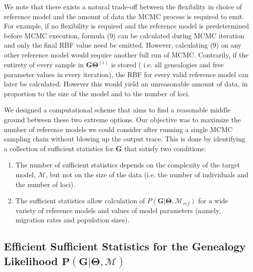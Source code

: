 \documentclass[11pt]{article}
\newcommand{\vect}[1]{\boldsymbol{\mathbf{#1}}}
\newcommand{\M}{\mathcal{M}}
\newcommand{\G}{\vect{G}}
\newcommand{\T}{\vect{\Theta}}
\newcommand{\GT}{\G\T}
\newcommand{\Mref}{\M_{ref}}
\newcommand{\1}{\mathbbm{1}}
\begin{document}
We note that there exists a natural trade-off between the flexibility in choice of reference model and the amount of data the MCMC process is required to emit. For example, if no flexibility is required and the reference model is predetermined before MCMC execution, formula (9) can be calculated during MCMC iteration and only the final RBF value need be emitted. However, calculating (9) on any other reference model would require another full run of MCMC.
Contrarily, if the entirety of every sample in  $\GT^{(i)}$ is stored ( i.e. all genealogies and free parameter values in every iteration), the RBF for every valid reference model can later be calculated. However this would yield an unreasonable amount of data, in proportion to the size of the model and to the number of loci.


We designed a computational scheme that aims to find a reasonable middle ground between these two extreme options.
Our objective was to maximize the number of reference models we could consider after running a single MCMC sampling chain without blowing up the output trace.
This is done by identifying a collection of sufficient statistics for $\G$ that satisfy two conditions:
%
%
\begin{enumerate}
 \item The number of sufficient statistics depends on the complexity of the target model, $\M$, but not on the size of the data (i.e. the number of individuals and the number of loci).
 \item The sufficient statistics allow calculation of $P(\G|\T,\Mref)$ for a wide variety of reference models and values of model parameters (namely, migration rates and population sizes).
\end{enumerate}
%
%
\subsection{Efficient Sufficient Statistics for the Genealogy Likelihood $\mathbf{P(G|\Theta, \M)}$}
\end{document}
